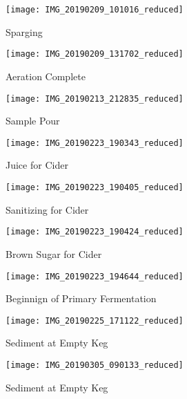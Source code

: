 \begin{figure}[H]
  \centering
  \texttt{[image: IMG\_20190209\_101016\_reduced]}
  \caption{Sparging}\label{fig:brew:sparge}
\end{figure}

\begin{figure}[H]
  \centering
  \texttt{[image: IMG\_20190209\_131702\_reduced]}
  \caption{Aeration Complete}\label{fig:brew:aeration}
\end{figure}

\begin{figure}[H]
  \centering
  \texttt{[image: IMG\_20190213\_212835\_reduced]}
  \caption{Sample Pour}\label{fig:sample:pour}
\end{figure}

\begin{figure}[H]
  \centering
  \texttt{[image: IMG\_20190223\_190343\_reduced]}
  \caption{Juice for Cider}\label{fig:brew:juice}
\end{figure}

\begin{figure}[H]
  \centering
  \texttt{[image: IMG\_20190223\_190405\_reduced]}
  \caption{Sanitizing for Cider}\label{fig:brew:sanitizing}
\end{figure}

\begin{figure}[H]
  \centering
  \texttt{[image: IMG\_20190223\_190424\_reduced]}
  \caption{Brown Sugar for Cider}\label{fig:brew:brownsugar}
\end{figure}

\begin{figure}[H]
  \centering
  \texttt{[image: IMG\_20190223\_194644\_reduced]}
  \caption{Beginnign of Primary Fermentation}\label{fig:brew:primary}
\end{figure}

\begin{figure}[H]
  \centering
  \texttt{[image: IMG\_20190225\_171122\_reduced]}
  \caption{Sediment at Empty Keg}\label{fig:keg2:empty}
\end{figure}

\begin{figure}[H]
  \centering
  \texttt{[image: IMG\_20190305\_090133\_reduced]}
  \caption{Sediment at Empty Keg}\label{fig:keg3:empty}
\end{figure}

